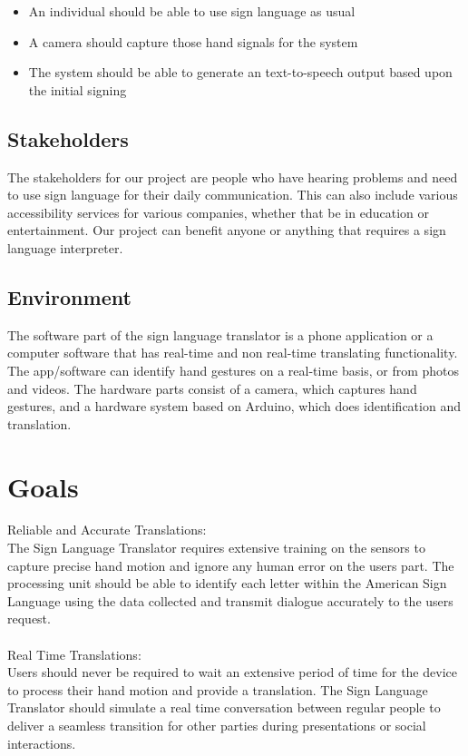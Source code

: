 \documentclass{article}
\begin{document}
\begin{itemize}
    \item An individual should be able to use sign language as usual
    \item A camera should capture those hand signals for the system
    \item The system should be able to generate an text-to-speech output 
    based upon the initial signing
\end{itemize}

\subsection{Stakeholders}

The stakeholders for our project are people who have hearing problems and need to use sign language for their daily
communication. This can also include various accessibility services for various companies, whether that be in education
or entertainment. Our project can benefit anyone or anything that requires a sign language interpreter.

\subsection{Environment}

The software part of the sign language translator is a phone application or a computer software that has real-time and non real-time translating functionality. The app/software can identify hand gestures on a real-time basis, or from photos and videos. The hardware parts consist of a camera, which captures hand gestures, and a hardware system based on Arduino, which does identification and translation.

\section{Goals}

Reliable and Accurate Translations:\\
The Sign Language Translator requires extensive training on the sensors to capture precise hand motion and ignore any
human error on the user\textquotesingle s part. The processing unit should be able to identify each letter within the American Sign Language
using the data collected and transmit dialogue accurately to the user\textquotesingle s request.\\

~\\Real Time Translations:\\
User\textquotesingle s should never be required to wait an extensive period of time for the device to process their hand motion and provide
a translation. The Sign Language Translator should simulate a real time conversation between regular people to deliver a seamless
transition for other parties during presentations or social interactions.\\
\end{document}
